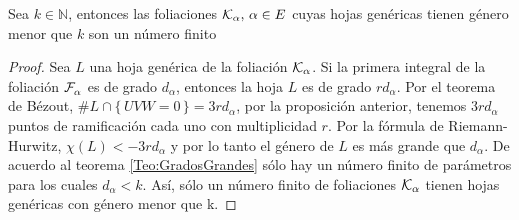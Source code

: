 \begin{Proposicion}
\label{Prop:UltimaProposicion}
Sea $k\in\mathbb{N}$, entonces las foliaciones $\mathcal{K}_{\alpha},\, \alpha\in E$ cuyas hojas genéricas tienen género menor que $k$ son un número finito
\end{Proposicion}
\begin{proof}
Sea $L$ una hoja genérica de la foliación $\mathcal{K}_{\alpha}$. Si la primera integral de la foliación $\mathcal{F}^{\ }_{\alpha}$ es de grado $d_{\alpha}$, entonces la hoja $L$ es de grado $rd_{\alpha}$. Por el teorema de Bézout, $\#L\cap\{\,  UVW=0\,\}=3rd_{\alpha}$, por la proposición anterior, tenemos $3rd_{\alpha}$ puntos de ramificación cada uno con multiplicidad $r$. Por la fórmula de Riemann-Hurwitz, $\chi(L)<-3rd_{\alpha}$ y por lo tanto el género de $L$ es más grande que $d_{\alpha}$. De acuerdo al teorema \ref{Teo:GradosGrandes} sólo hay un número finito de parámetros para los cuales $d_{\alpha}<k$. Así, sólo un número finito de foliaciones $\mathcal{K}_{\alpha}$ tienen hojas genéricas con género menor que k.
\end{proof}

